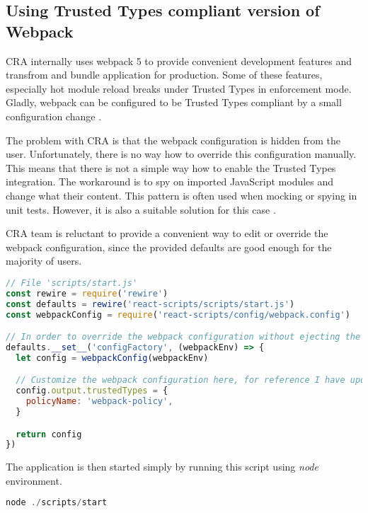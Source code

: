 \subsection{Using Trusted Types compliant version of Webpack}

CRA internally uses webpack 5 to provide convenient development features and transfrom and bundle
application for production. Some of these features, especially hot module reload breaks under
Trusted Types in enforcement mode. Gladly, webpack can be configured to be Trusted Types compliant
by a small configuration change \cite{webpack_tt_config}.

The problem with CRA is that the webpack configuration is hidden from the user. Unfortunately, there
is no way how to override this configuration manually. This means that there is not a simple way how
to enable the Trusted Types integration. The workaround is to spy on imported JavaScript modules and
change what their content. This pattern is often used when mocking or spying in unit tests. However,
it is also a suitable solution for this case \cite{cra_modify_webpack_config}.

CRA team is reluctant to provide a convenient way to edit or override the webpack configuration,
since the provided defaults are good enough for the majority of users.

\bigskip
\begin{lstlisting}[language=JavaScript, caption=Script to start React application with Trusted Types enabled in webpack]
// File 'scripts/start.js'
const rewire = require('rewire')
const defaults = rewire('react-scripts/scripts/start.js')
const webpackConfig = require('react-scripts/config/webpack.config')

// In order to override the webpack configuration without ejecting the create-react-app
defaults.__set__('configFactory', (webpackEnv) => {
  let config = webpackConfig(webpackEnv)

  // Customize the webpack configuration here, for reference I have updated webpack externals field
  config.output.trustedTypes = {
    policyName: 'webpack-policy',
  }

  return config
})
\end{lstlisting}

The application is then started simply by running this script using \emph{node} environment.

\bigskip
\begin{lstlisting}[language=JavaScript, caption=Starting the CRA application]
node ./scripts/start
\end{lstlisting}

